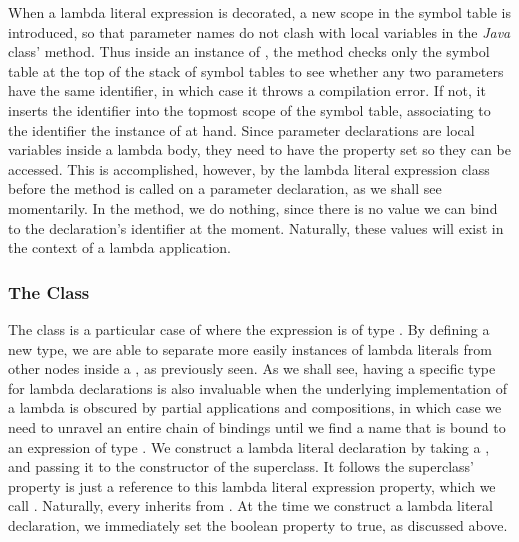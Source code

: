 When a lambda literal expression is decorated, a new scope in the symbol table is introduced, so that parameter names do not clash with local variables in the \emph{Java} class'  method. Thus inside an instance of , the  method checks only the symbol table at the top of the stack of symbol tables to see whether any two parameters have the same identifier, in which case it throws a compilation error. If not, it inserts the identifier into the topmost scope of the symbol table, associating to the identifier the instance of  at hand. Since parameter declarations are local variables inside a lambda body, they need to have the  property set so they can be accessed. This is accomplished, however, by the lambda literal expression class before the  method is called on a parameter declaration, as we shall see momentarily. In the  method, we do nothing, since there is no value we can bind to the declaration's identifier at the moment. Naturally, these values will exist in the context of a lambda application.

\subsubsection{The  Class}

The  class is a particular case of  where the expression is of type . By defining a new type, we are able to separate more easily instances of lambda literals from other nodes inside a , as previously seen. As we shall see, having a specific type for lambda declarations is also invaluable when the underlying implementation of a lambda is obscured by partial applications and compositions, in which case we need to unravel an entire chain of bindings until we find a name that is bound to an expression of type . We construct a lambda literal declaration by taking a , and passing it to the constructor of the superclass. It follows the superclass'  property is just a reference to this lambda literal expression property, which we call . Naturally, every  inherits from . At the time we construct a lambda literal declaration, we immediately set the  boolean property to true, as discussed above.

